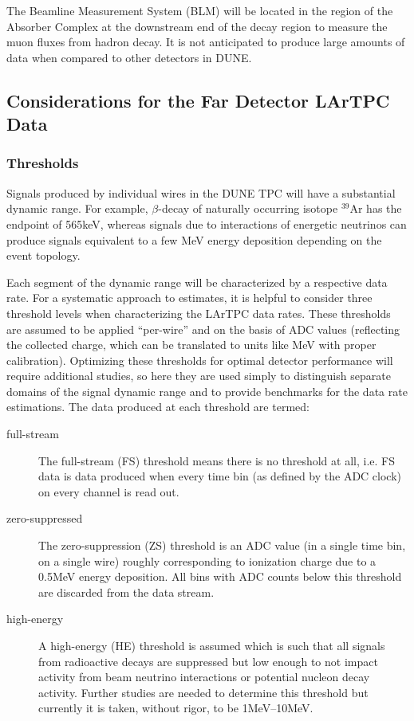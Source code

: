 The Beamline Measurement System (BLM) will be located in the region of the Absorber Complex
at the downstream end of the decay region to measure the muon fluxes from hadron decay.
It is not anticipated to produce large amounts of data when compared to other detectors in DUNE.

\subsection{Considerations for the Far Detector LArTPC Data}

\subsubsection{Thresholds}

Signals produced by individual wires in the DUNE TPC will have a substantial
dynamic range. For example, $\beta$-decay of naturally occurring isotope $^{39}$Ar has the endpoint of
565keV, whereas signals due to interactions of energetic neutrinos can produce signals
equivalent to a few MeV energy deposition depending on the event topology.

Each segment of the dynamic range will be characterized by a respective data rate. 
For a systematic approach to estimates, it is helpful to consider
three threshold levels when characterizing the LArTPC data rates. These
thresholds are assumed to be applied ``per-wire'' and on the basis of ADC values (reflecting the collected charge, which can be translated to units like MeV with proper calibration). Optimizing these thresholds
for optimal detector performance will require additional studies, so here they are used simply
to distinguish separate domains of the signal dynamic range and to provide benchmarks for the data
rate estimations. The data produced at each threshold are termed:

\begin{description}
	
\item[full-stream] The full-stream (FS) threshold means there is no threshold at all, i.e.
FS data is data produced when every time bin (as defined by the ADC clock) on every channel is read out.

\item[zero-suppressed] The zero-suppression (ZS) threshold is an ADC value (in a single time bin,
on a single wire) roughly corresponding to ionization charge due to a 0.5MeV energy deposition.
All bins with ADC counts below this threshold are discarded from the data stream.

\item[high-energy] A high-energy (HE) threshold is assumed which is
  such that all signals from radioactive decays are suppressed but low
  enough to not impact activity from beam neutrino interactions or
  potential nucleon decay activity.
  Further studies are needed to determine this threshold but currently
  it is taken, without rigor, to be 1MeV--10MeV.
\end{description}


